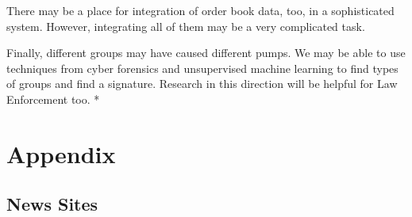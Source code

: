 \documentclass[letterpaper]{article}
\begin{document}
There may be a place for integration of order book data, too, in a sophisticated system. However, integrating 
all of them may be a very complicated task.\par

Finally, different groups may have caused different pumps. We may be able to use techniques
from cyber forensics and unsupervised machine learning to find types of groups and find a signature. 
 Research in this direction will be helpful for Law Enforcement 
too.
*



\newpage
\onecolumn

\section{Appendix}
\label{sec:appendix}

\subsection{News Sites}
\label{sec:news_sites}
\end{document}
